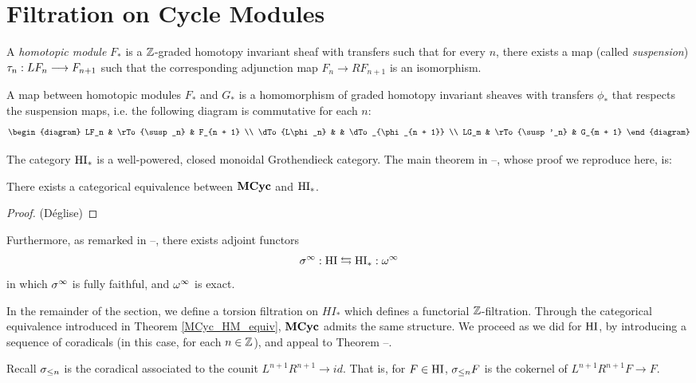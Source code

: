 \section{Filtration on Cycle Modules}


\begin{definition}
A \emph{homotopic module} $F_*$ is a $\mathbb{Z}$-graded homotopy 
invariant sheaf with transfers such that for every $n$, there
exists a map (called \emph{suspension}) $\tau_n: LF_n \longrightarrow F_{n+1}$
such that the corresponding adjunction map $F_n \to RF_{n+1}$
is an isomorphism.

A map between homotopic modules $F_*$ and $G_*$ is a homomorphism 
of graded homotopy invariant sheaves with transfers $\phi_*$ that 
respects the suspension maps, i.e. the following diagram is 
commutative for each $n$:
\[
\begin{diagram}
LF_n          & \rTo{\susp_n}  & F_{n + 1}          \\
\dTo{L\phi_n} &                & \dTo_{\phi_{n + 1}} \\
LG_m          & \rTo{\susp'_n} & G_{m + 1}
\end{diagram}
\]
\end{definition}

The category $\mathrm{HI}_*$ is a well-powered, closed monoidal 
Grothendieck category. The main theorem in --, whose proof we 
reproduce here, is:

\begin{thm}\label{MCyc_HM_equiv}
There exists a categorical equivalence between $\mathbf{MCyc}$
and $\mathrm{HI}_*$.
\end{thm}
\begin{proof}(D\'eglise)
\end{proof}

Furthermore, as remarked in --, there exists adjoint functors
\[
\sigma^\infty: \mathrm{HI} \leftrightarrows \mathrm{HI}_* : \omega^\infty
\]
in which $\sigma^\infty$ is fully faithful, and $\omega^\infty$ is exact.

In the remainder of the section, we define a torsion filtration on
$HI_*$ which defines a functorial $\mathbb{Z}$-filtration. Through the 
categorical equivalence introduced in Theorem \ref{MCyc_HM_equiv}, 
$\mathbf{MCyc}$ admits the same structure. We proceed as we did for
$\mathrm{HI}$, by introducing a sequence of coradicals (in this case, for 
each $n \in \mathbb{Z}$), and appeal to Theorem --.

Recall $\sigma_{\leq n}$ is the coradical associated to the counit
$L^{n + 1}R^{n + 1} \to id$. That is, for $F \in \mathrm{HI}$, $\sigma_{\leq n}F$
is the cokernel of $L^{n + 1}R^{n + 1}F \to F$.

